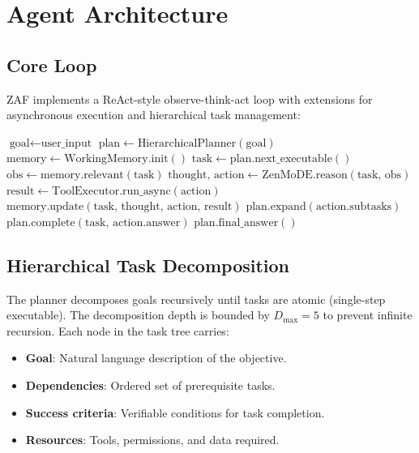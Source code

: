 \documentclass[11pt,a4paper]{article}
\begin{document}
\section{Agent Architecture}

\subsection{Core Loop}

ZAF implements a ReAct-style observe-think-act loop with extensions for asynchronous execution and hierarchical task management:

\begin{algorithm}
\caption{Zen Agent Core Loop}
\begin{algorithmic}[1]
\State $\text{goal} \leftarrow \text{user\_input}$
\State $\text{plan} \leftarrow \text{HierarchicalPlanner}(\text{goal})$
\State $\text{memory} \leftarrow \text{WorkingMemory.init}()$
  \State $\text{task} \leftarrow \text{plan.next\_executable}()$
  \State $\text{obs} \leftarrow \text{memory.relevant}(\text{task})$
  \State $\text{thought, action} \leftarrow \text{ZenMoDE.reason}(\text{task, obs})$
    \State $\text{result} \leftarrow \text{ToolExecutor.run\_async}(\text{action})$
    \State $\text{memory.update}(\text{task, thought, action, result})$
    \State $\text{plan.expand}(\text{action.subtasks})$
    \State $\text{plan.complete}(\text{task, action.answer})$
  \EndIf
\EndWhile
\State \Return $\text{plan.final\_answer}()$
\end{algorithmic}
\end{algorithm}

\subsection{Hierarchical Task Decomposition}

The planner decomposes goals recursively until tasks are atomic (single-step executable). The decomposition depth is bounded by $D_{\max} = 5$ to prevent infinite recursion. Each node in the task tree carries:

\begin{itemize}
  \item \textbf{Goal}: Natural language description of the objective.
  \item \textbf{Dependencies}: Ordered set of prerequisite tasks.
  \item \textbf{Success criteria}: Verifiable conditions for task completion.
  \item \textbf{Resources}: Tools, permissions, and data required.
\end{itemize}
\end{document}
